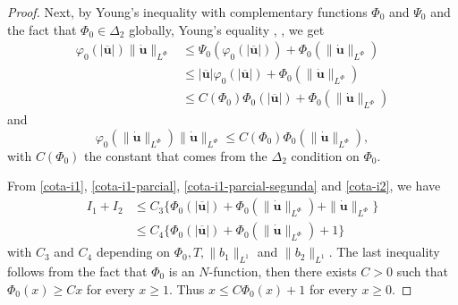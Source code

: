 \documentclass[twoside]{article}
\theoremstyle{remark}
\newcommand{\orlnor}{\|_{L^{\Phi}}}
\renewcommand{\b}[1]{\boldsymbol{#1}}
\renewcommand{\leq}{\leqslant}
\renewcommand{\geq}{\geqslant}
\begin{document}
\begin{proof}
Next, by Young's inequality with complementary functions $\Phi_0$ and $\Psi_0$ and the fact that 
$\Phi_0 \in \Delta_2$ globally, Young's equality \cite[Eq. 2.7-2.8]{KR}, \cite[Th. 3-(ii), p. 23]{rao1991theory}, we get
\begin{equation}\label{cota-i1-parcial}
 \begin{split}
\varphi_0(|\b{\overline{u}}|) \|\b{\dot{u}}\orlnor
&\leq 
\Psi_0(\varphi_0(|\b{\overline{u}}|))+
\Phi_0(\|\b{\dot{u}}\orlnor)
\\
&\leq 
|\b{\overline{u}}|\varphi_0(|\b{\overline{u}}|)
+\Phi_0(\|\b{\dot{u}}\orlnor)
\\
&\leq C(\Phi_0)
\Phi_0(|\b{\overline{u}}|)
+\Phi_0(\|\b{\dot{u}}\orlnor)
\end{split}
\end{equation}
and 
\begin{equation}\label{cota-i1-parcial-segunda}
\varphi_0(\|\b{\dot u}\orlnor) \|\b{\dot u}\orlnor
\leq 
C(\Phi_0) \Phi_0(\|\b{\dot u}\orlnor),
\end{equation}
with $C(\Phi_0)$ the constant that comes from the $\Delta_2$ condition on $\Phi_0$.

From \eqref{cota-i1}, \eqref{cota-i1-parcial}, \eqref{cota-i1-parcial-segunda} and \eqref{cota-i2},
we have
\begin{equation}\label{cota-i1-i2}
\begin{split}
I_1+I_2
&
\leq C_3
\bigg\{ 
\Phi_0(|\b{\overline{u}}|)
+\Phi_0(\|\b{\dot{u}}\orlnor)
+\|\b{\dot{u}}\orlnor
\bigg\}\\
&
\leq C_4
\bigg\{ 
\Phi_0(|\b{\overline{u}}|)
+\Phi_0(\|\b{\dot{u}}\orlnor)
+1
\bigg\}
\end{split}
\end{equation}
with $C_3$ and $C_4$ depending on $\Phi_0,T, \|b_1\|_{L^1}$ and $\|b_2\|_{L^1} $. The last inequality follows from the fact that $\Phi_0$ is an $N$-function, then there exists $C>0$ such that $\Phi_0(x)\geq Cx$ for every $x\geq 1$. Thus $x\leq C\Phi_0(x)+1$ for every $x\geq 0$.



\end{proof}
\end{document}
